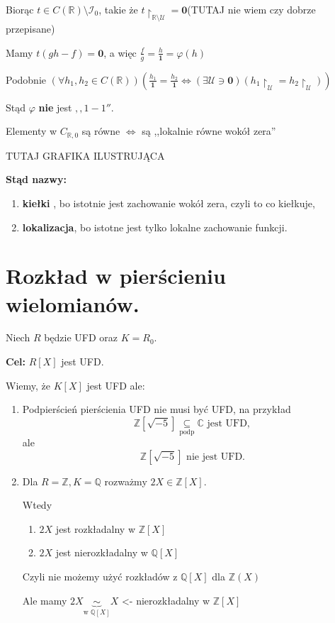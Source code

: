 Biorąc $t\in C\left( \mathbb{R}  \right) \setminus \mathcal{I}_{0}$, takie że $t\restriction_{\scriptscriptstyle \mathbb{R} \setminus \mathcal{U}} = \mathbf{0} $(TUTAJ nie wiem czy dobrze przepisane)

 Mamy $t\left( gh-f \right) = \mathbf{0}$, a więc $\frac{f}{g}= \frac{h}{\mathbf{1}}= \varphi \left( h \right)  $

 Podobnie $\left(\forall h_1,h_2 \in C\left( \mathbb{R}  \right)  \right) \left( \frac{h_1}{\mathbf{1}} = \frac{h_2}{\mathbf{1}} \iff \left(\exists \mathcal{U} \ni \mathbf{0} \right) \left( h_1\restriction_{\mathcal{U}} = h_2\restriction_{\mathcal{U}}  \right)  \right)  $ 

 Stąd $\varphi  $ \textbf{nie} jest $,,1-1''$.

 Elementy w  $C_{\mathbb{R} ,0}$ są równe $\iff $ są ,,lokalnie równe wokół zera''
 \begin{remark}
 	TUTAJ GRAFIKA ILUSTRUJĄCA
 \end{remark} 

 \textbf{Stąd nazwy:}  
 \begin{enumerate}[label=\arabic*)]
 	\item \textbf{kiełki} , bo istotnie jest zachowanie wokół zera, czyli to co kiełkuje,
	\item \textbf{lokalizacja}, bo istotne jest tylko lokalne zachowanie funkcji.
 \end{enumerate}

 \section{Rozkład w pierścieniu wielomianów.}

 Niech $R$ będzie UFD oraz $K=R_{0}$.

 \textbf{Cel:} $R\left[ X \right] $ jest UFD.

 Wiemy, że $K\left[ X \right] $ jest UFD ale:
 \begin{enumerate}[label=\arabic*)]
 	\item Podpierścień pierścienia UFD nie musi być UFD, na przykład 
		\[
		\mathbb{Z} \left[ \sqrt{-5}  \right] \underset{\scriptscriptstyle\text{podp}}{\subseteq} \mathbb{C} \text{ jest UFD}
		,\] 
		ale \[
		\mathbb{Z} \left[ \sqrt{-5}  \right] \text{ nie jest UFD}
		.\] 
	\item Dla $R = \mathbb{Z} , K=\mathbb{Q} $ rozważmy $2X \in \mathbb{Z} \left[ X \right] $.

		Wtedy 
		\begin{enumerate}[label=\roman*)]
			\item $2X$ jest rozkładalny w $\mathbb{Z} \left[ X \right] $ 
			\item  $2X$ jest nierozkładalny w $\mathbb{Q} \left[ X \right] $
		\end{enumerate}
		Czyli nie możemy użyć rozkładów z $\mathbb{Q} \left[ X \right] $ dla $\mathbb{Z} \left( X \right) $ 

		Ale mamy $2X \underbrace{\sim  }_{\text{w } \mathbb{Q} \left[ X \right] }X$ <- nierozkładalny w $\mathbb{Z}\left[ X \right] $ 
 \end{enumerate}

